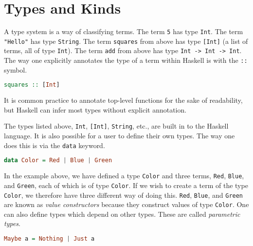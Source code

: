 \documentclass[MS, xcolor=dvipsnames]{wfuthesis}
\theoremstyle{definition}
\begin{document}
\section{Types and Kinds}
A type system is a way of classifying terms. The term \lstinline{5} has type \lstinline{Int}. The term \lstinline{"Hello"} has type \lstinline{String}. The term \lstinline{squares} from above has type \lstinline{[Int]} (a list of terms, all of type \lstinline{Int}). The term \lstinline{add} from above has type \lstinline{Int -> Int -> Int}. The way one explicitly annotates the type of a term within Haskell is with the \lstinline{::} symbol.
\begin{lstlisting}[language=Haskell]
squares :: [Int]
\end{lstlisting}
It is common practice to annotate top-level functions for the sake of readability, but Haskell can infer most types without explicit annotation. \par
The types listed above, \lstinline{Int}, \lstinline{[Int]}, \lstinline{String}, etc., are built in to the Haskell language. It is also possible for a user to define their own types. The way one does this is via the \lstinline{data} keyword.
\begin{lstlisting}[language=Haskell]
data Color = Red | Blue | Green
\end{lstlisting}
In the example above, we have defined a type \lstinline{Color} and three terms, \lstinline{Red}, \lstinline{Blue}, and \lstinline{Green}, each of which is of type \lstinline{Color}. If we wish to create a term of the type \lstinline{Color}, we therefore have three different way of doing this. \lstinline{Red}, \lstinline{Blue}, and \lstinline{Green} are known as \emph{value constructors} because they construct values of type \lstinline{Color}. One can also define types which depend on other types. These are called \emph{parametric types}.
\begin{lstlisting}[language=Haskell]
Maybe a = Nothing | Just a
\end{lstlisting}
\end{document}
